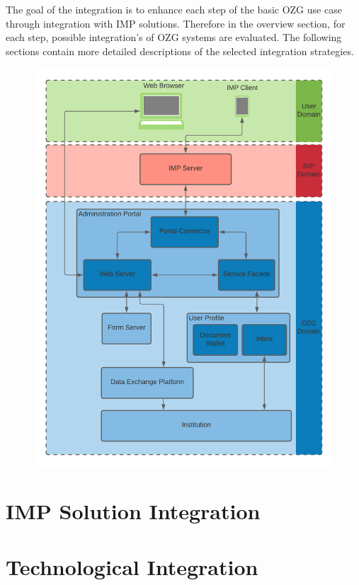 \documentclass[
     12pt,         %
     a4paper,      %
     BCOR=10mm,version=first,     %
     DIV=14,version=first,        %
     ]{scrreprt}
\begin{document}
The goal of the integration is to enhance each step of the basic OZG use case through integration with IMP solutions. Therefore in the overview section, for each step, possible integration's of OZG systems are evaluated. The following sections contain more detailed descriptions of the selected integration strategies.

\begin{figure}[h]
    \centering
    \includegraphics[scale=0.15]{Diagrams/Integration Architecture 1/Overview.png}
\end{figure}

\section{IMP Solution Integration}



\section{Technological Integration}
\end{document}
